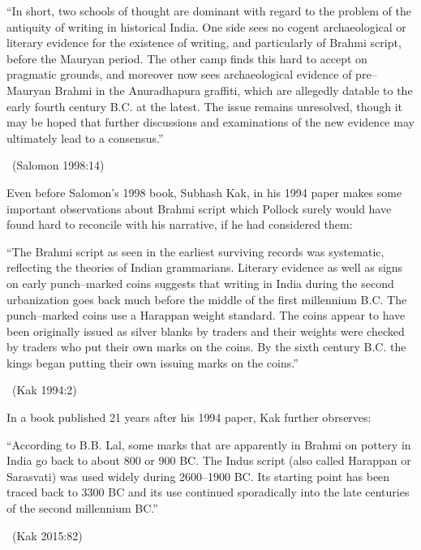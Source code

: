 \begin{myquote}
“In short, two schools of thought are dominant with regard to the problem of the antiquity of writing in historical India. One side sees no cogent archaeological or literary evidence for the existence of writing, and particularly of Brahmi script, before the Mauryan period. The other camp finds this hard to accept on pragmatic grounds, and moreover now sees archaeological evidence of pre–Mauryan Brahmi in the Anuradhapura graffiti, which are allegedly datable to the early fourth century B.C. at the latest. The issue remains unresolved, though it may be hoped that further discussions and examinations of the new evidence may ultimately lead to a consensus.” 

~\hfill (Salomon 1998:14)
\end{myquote}

Even before Salomon’s 1998 book, Subhash Kak, in his 1994 paper makes some important observations about Brahmi script which Pollock surely would have found hard to reconcile with his narrative, if he had considered them:

\begin{myquote}
“The Brahmi script as seen in the earliest surviving records was systematic, reflecting the theories of Indian grammarians. Literary evidence as well as signs on early punch–marked coins suggests that writing in India during the second urbanization goes back much before the middle of the first millennium B.C. The punch–marked coins use a Harappan weight standard. The coins appear to have been originally issued as silver blanks by traders and their weights were checked by traders who put their own marks on the coins. By the sixth century B.C. the kings began putting their own issuing marks on the coins.” 

~\hfill (Kak 1994:2)
\end{myquote}

In a book published 21 years after his 1994 paper, Kak further obrserves:

\begin{myquote}
“According to B.B. Lal, some marks that are apparently in Brahmi on pottery in India go back to about 800 or 900 BC. The Indus script (also called Harappan or Sarasvati) was used widely during 2600–1900 BC. Its starting point has been traced back to 3300 BC and its use continued sporadically into the late centuries of the second millennium BC.” 

~\hfill (Kak 2015:82)
\end{myquote}

